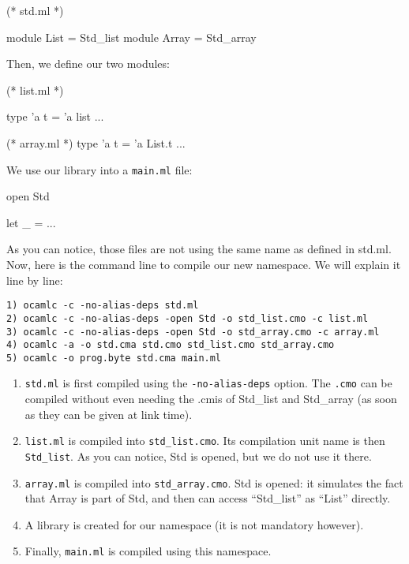 \documentclass[11pt,a4paper]{article}
\begin{document}
\begin{OCaml}
(* std.ml *)

module List = Std_list
module Array = Std_array
\end{OCaml}

Then, we define our two modules:

\begin{OCaml}
(* list.ml *)

type 'a t = 'a list
...

(* array.ml *)
type 'a t = 'a List.t 
...
\end{OCaml}

We use our library into a \texttt{main.ml} file:

\begin{OCaml}
open Std

let _ = ...
\end{OCaml}

As you can notice, those files are not using the same name as defined in
std.ml. Now, here is the command line to compile our new namespace. We will
explain it line by line:

\begin{verbatim}
1) ocamlc -c -no-alias-deps std.ml
2) ocamlc -c -no-alias-deps -open Std -o std_list.cmo -c list.ml
3) ocamlc -c -no-alias-deps -open Std -o std_array.cmo -c array.ml
4) ocamlc -a -o std.cma std.cmo std_list.cmo std_array.cmo
5) ocamlc -o prog.byte std.cma main.ml
\end{verbatim}

\begin{enumerate}
\item \texttt{std.ml} is first compiled using the \texttt{-no-alias-deps}
  option. The \texttt{.cmo} can be compiled without even needing the .cmis of Std\_list
  and Std\_array (as soon as they can be given at link time).
\item \texttt{list.ml} is compiled into \texttt{std\_list.cmo}. Its compilation
  unit name is then \lstinline{Std_list}. As you can notice, Std is opened, but
  we do not use it there.
\item \texttt{array.ml} is compiled into \texttt{std\_array.cmo}. Std is opened:
  it simulates the fact that Array is part of Std, and then can access
  ``Std\_list'' as ``List'' directly.
\item A library is created for our namespace (it is not mandatory however).
\item Finally, \texttt{main.ml} is compiled using this namespace.
\end{enumerate}
\end{document}
